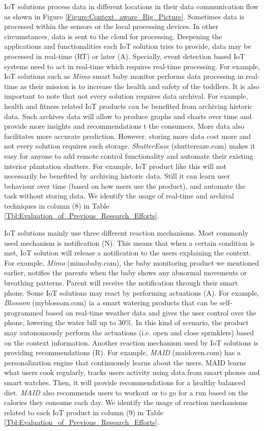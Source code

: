 \documentclass[journal]{IEEEtran}
\begin{document}
IoT solutions process data in different locations in their data communication flow as shown in Figure \ref{Figure:Context_aware_Big_Picture}. Sometimes data is processed within the sensors or the local processing devices. In other circumstances, data is sent to the cloud for processing. Deepening the applications and functionalities each IoT solution tries to provide, data may be processed in real-time (RT) or later (A). Specially, event detection based IoT systems need to act in real-time which requires real-time processing. For example, IoT solutions such as \textit{Mimo} smart baby monitor performs data processing in real-time as their mission is to increase the health and safety of the toddlers. It is also important to note that not every solution requires data archival. For example, health and fitness related IoT products can be benefited from archiving historic data. Such archives data will allow to produce graphs and charts over time and provide   more insights and recommendations t the consumers. More data also facilitates more accurate prediction. However. storing more data cost more and not every solution requires such storage. \textit{ShutterEaze} (shuttereaze.com)  makes it easy for anyone to add remote control functionality and automate their existing interior plantation shutters. For example, IoT product like this will  not necessarily  be benefited by  archiving historic data. Still it can learn user behaviour over time (based on how users use the product), and automate the task without storing data. We identify the usage of real-time and archival techniques   in column (8) in Table \ref{Tbl:Evaluation_of_Previous_Research_Efforts}.


IoT solutions mainly use three different reaction mechanisms. Most commonly used mechanism is notification (N). This means that when a certain condition is met, IoT solution will release a notification to the users explaining the context. For example, \textit{Mimo} (mimobaby.com), the baby monitoring product we mentioned earlier, notifies the parents when the baby shows any abnormal movements or breathing patterns. Parent will receive the notification through their smart phone. Some IoT solutions may react by performing actuations (A). For example, \textit{Blossom} (myblossom.com) ia a smart watering products that can be self-programmed based on real-time weather data and gives the user control over the phone, lowering the water bill up to 30\%. In this kind of scenario, the product may autonomously perform the actuations (i.e. open and close sprinklers) based on the context information. Another reaction mechanism used by IoT solutions is providing recommendations (R). For example, \textit{MAID} (maidoven.com)  has a personalization engine that continuously learns about the users. MAID learns what users cook regularly, tracks users activity using data from smart phones and smart watches. Then, it will  provide recommendations for a healthy balanced diet. \textit{MAID} also recommends users to workout or to go for a run based on the calories they consume each day. We identify the usage of reaction mechanisms related to each IoT product  in column (9) in Table \ref{Tbl:Evaluation_of_Previous_Research_Efforts}.
\end{document}
